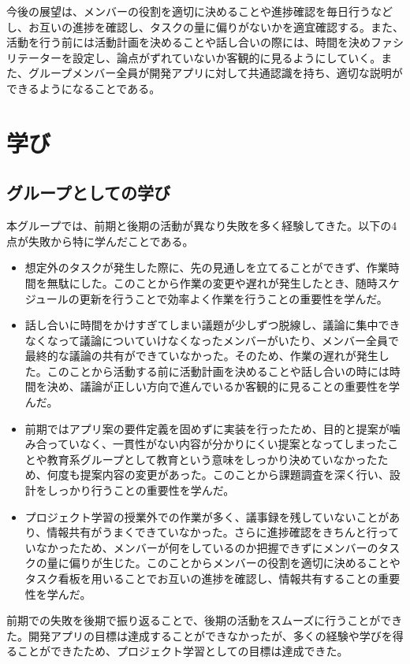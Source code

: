 \documentclass[openany,11pt,papersize]{jsbook}
\begin{document}
\par
今後の展望は、メンバーの役割を適切に決めることや進捗確認を毎日行うなどし、お互いの進捗を確認し、タスクの量に偏りがないかを適宜確認する。また、活動を行う前には活動計画を決めることや話し合いの際には、時間を決めファシリテーターを設定し、論点がずれていないか客観的に見るようにしていく。また、グループメンバー全員が開発アプリに対して共通認識を持ち、適切な説明ができるようになることである。




\chapter{学び}
\section{グループとしての学び}
本グループでは、前期と後期の活動が異なり失敗を多く経験してきた。以下の4点が失敗から特に学んだことである。
\begin{itemize}
\item 
想定外のタスクが発生した際に、先の見通しを立てることができず、作業時間を無駄にした。このことから作業の変更や遅れが発生したとき、随時スケジュールの更新を行うことで効率よく作業を行うことの重要性を学んだ。

\item 
話し合いに時間をかけすぎてしまい議題が少しずつ脱線し、議論に集中できなくなって議論についていけなくなったメンバーがいたり、メンバー全員で最終的な議論の共有ができていなかった。そのため、作業の遅れが発生した。このことから活動する前に活動計画を決めることや話し合いの時には時間を決め、議論が正しい方向で進んでいるか客観的に見ることの重要性を学んだ。

\item
前期ではアプリ案の要件定義を固めずに実装を行ったため、目的と提案が噛み合っていなく、一貫性がない内容が分かりにくい提案となってしまったことや教育系グループとして教育という意味をしっかり決めていなかったため、何度も提案内容の変更があった。このことから課題調査を深く行い、設計をしっかり行うことの重要性を学んだ。

\item
プロジェクト学習の授業外での作業が多く、議事録を残していないことがあり、情報共有がうまくできていなかった。さらに進捗確認をきちんと行っていなかったため、メンバーが何をしているのか把握できずにメンバーのタスクの量に偏りが生じた。このことからメンバーの役割を適切に決めることやタスク看板を用いることでお互いの進捗を確認し、情報共有することの重要性を学んだ。

\end{itemize}
\par
前期での失敗を後期で振り返ることで、後期の活動をスムーズに行うことができた。開発アプリの目標は達成することができなかったが、多くの経験や学びを得ることができたため、プロジェクト学習としての目標は達成できた。
\end{document}
